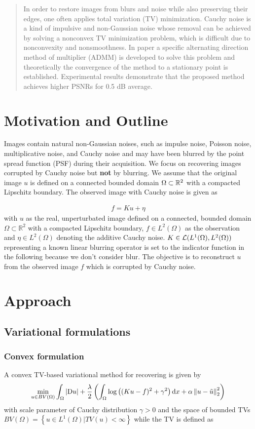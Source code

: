 \begin{abstract}
In order to restore images from blurs and noise while also preserving their edges, one often applies
total variation (TV) minimization. Cauchy noise is a kind of impulsive and non-Gaussian noise whose removal can
be achieved by solving a nonconvex TV minimization problem, which is difficult due to nonconvexity and nonsmoothness. In paper \cite{MR3761275} 
a specific alternating direction method of multiplier (ADMM) is developed to solve this problem and theoretically the convergence of the method to a stationary point is established. Experimental results demonstrate that the proposed method achieves higher PSNRs for 0.5 dB average.
\end{abstract}

\section{Motivation and Outline}
Images contain natural non-Gaussian noises, such as impulse noise, Poisson noise, multiplicative noise, and Cauchy noise and may have been blurred by the point spread function (PSF) during their acquisition.
We focus on recovering images corrupted by Cauchy noise but \textbf{not} by blurring.
We assume that the original image $u$ is defined on a connected bounded domain
$\Omega \subset \mathbb{R}^2$ with a compacted Lipschitz boundary. The observed image with Cauchy
noise is given as

\begin{align}\label{eq:1}
    f = K u + \eta
\end{align}
with $u$ as the real, unperturbated image defined on a connected, bounded domain $\Omega \subset \mathbb{R}^2$ with a compacted Lipschitz boundary, $f\in L^2(\Omega)$ as the observation and $\eta \in L^2(\Omega)$ denoting the additive Cauchy noise. $K \in \mathcal{L}(L^1(\Omega),L^2(\Omega))$ representing a known linear blurring operator is set to the indicator function in the following because we don't consider blur.
The objective is to reconstruct $u$ from the observed image $f$ which is corrupted by Cauchy noise.

\section{Approach}
\subsection{Variational formulations}
\subsubsection{Convex formulation}
A convex TV-based variational method for recovering is given by
\begin{equation} \label{eq:2}
\min_{u \in BV(\Omega)} \int_\Omega \abs{{\mathop{}\!\mathrm{D} u}} + \frac{\lambda}{2} \left(\int_\Omega \log \left((K u - f)^2 + \gamma^2 \right) \mathop{}\!\mathrm{d} x + \alpha \left\lVert u-\Tilde{u}\right\rVert_2^2\right)
\end{equation}
with scale parameter of Cauchy distribution $\gamma > 0$ and the space of bounded TVs $BV(\Omega) = \left\{u \in L^1(\Omega) \vert TV(u) < \infty \right\}$ while the TV is defined as

